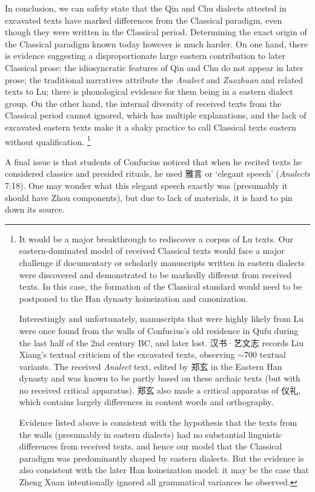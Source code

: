 \documentclass[UTF8, a4paper, oneside, scheme=plain, 12pt]{ctexrep}
\newcommand{\work}[1]{\textit{#1}}
\newcommand{\translate}[1]{`#1'}
\begin{document}
In conclusion, we can safety state that the Qin and Chu dialects attested in excavated texts have marked differences from the Classical paradigm, even though they were written in the Classical period.
Determining the exact origin of the Classical paradigm known today however is much harder.
On one hand, there is evidence suggesting a disproportionate large eastern contribution to later Classical prose:
the idiosyncratic features of Qin and Chu do not appear in later prose; 
the traditional narratives attribute the \work{Analect} and \work{Zuozhuan} and related texts to Lu;
there is phonological evidence for them being in a eastern dialect group.
On the other hand, the internal diversity of received texts from the Classical period cannot ignored,
which has multiple explanations,
and the lack of excavated eastern texts make it a shaky practice to call Classical texts eastern without qualification.%
\footnote{
    It would be a major breakthrough to rediscover a corpus of Lu texts.
    Our eastern-dominated model of received Classical texts would face a major challenge 
    if documentary or scholarly manuscripts written in eastern dialects were discovered and demonstrated to be markedly different from received texts.
    In this case, the formation of the Classical standard would need to be postponed to the Han dynasty koineization and canonization.

    Interestingly and unfortunately, manuscripts that were highly likely from Lu were once found from the walls of Confucius's old residence in Qufu during the last half of the 2nd century BC, and later lost.
    汉书·艺文志 records Liu Xiang's textual criticism of the excavated texts,
    observing $\sim 700$ textual variants. 
    The received \work{Analect} text, edited by 郑玄 in the Eastern Han dynasty and was known to be partly based on these archaic texts (but with no received critical apparatus).
    郑玄 also made a critical apparatus of 仪礼, which contains largely differences in content words and orthography.

    Evidence listed above is consistent with the hypothesis that the texts from the walls (presumably in eastern dialects) had no substantial linguistic differences from received texts,
    and hence our model that the Classical paradigm was predominantly shaped by eastern dialects.
    But the evidence is also consistent with the later Han koineization model:
    it may be the case that Zheng Xuan intentionally ignored all grammatical variances he observed.
}

A final issue is that students of Confucius noticed that when he recited texts he considered classics and presided rituals,
he used 雅言 or \translate{elegant speech} (\work{Analects} 7:18).
One may wonder what this elegant speech exactly was (presumably it should have Zhou components),
but due to lack of materials, it is hard to pin down its source.
\end{document}
